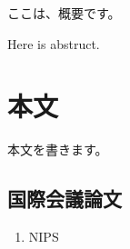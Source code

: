 \documentclass{thesis}
\begin{document}
\begin{jabst}
    ここは、概要です。
\end{jabst}
\begin{eabst}
    Here is abstruct.
\end{eabst}

\frontmatter

\tableofcontents
\listoffigures
\listoftables

\mainmatter
\chapter{本文}
本文を書きます。

\begin{thebibliography}{} %
\end{thebibliography}
%

\newpage
\section*{国際会議論文}
\begin{enumerate}[{1)}]
    \item NIPS
\end{enumerate}

\appendix
\end{document}
